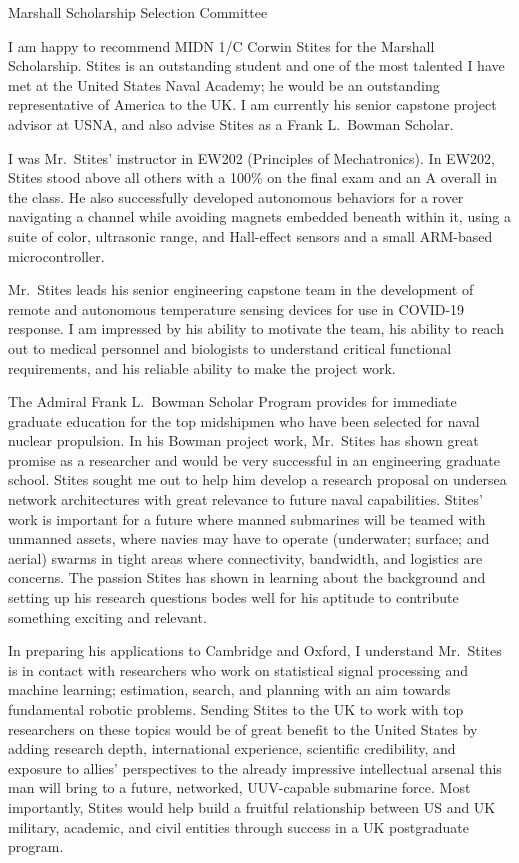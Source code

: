 \documentclass[10pt]{wrceletter}
\date{\today}
\begin{document}
\begin{letter}{%
Marshall Scholarship Selection Committee}

\opening{}
\raggedright %
\setlength{\parindent}{15pt} %
I am happy to recommend MIDN 1/C Corwin Stites for the Marshall Scholarship.  Stites is an outstanding student and one of the most talented I have met at the United States Naval Academy; he would be an outstanding representative of America to the UK. I am currently his senior capstone project advisor at USNA, and also advise Stites as a Frank L.~Bowman Scholar. 

I was Mr.~Stites' instructor in EW202 (Principles of Mechatronics).  In EW202, Stites stood above all others with a 100\% on the final exam and an A overall in the class. He also successfully developed autonomous behaviors for a rover navigating a channel while avoiding magnets embedded beneath within it, using a suite of color, ultrasonic range, and Hall-effect sensors and a small ARM-based microcontroller. 

Mr.~Stites leads his senior engineering capstone team in the development of remote and autonomous temperature sensing devices for use in COVID-19 response. I am impressed by his ability to motivate the team, his ability to reach out to medical personnel and biologists to understand critical functional requirements, and his reliable ability to make the project work. 

The Admiral Frank L.~Bowman Scholar Program provides for immediate graduate education for the top midshipmen who have been selected for naval nuclear propulsion. In his Bowman project work, Mr.~Stites has shown great promise as a researcher and would be very successful in an engineering graduate school. Stites sought me out to help him develop a research proposal on undersea network architectures with great relevance to future naval capabilities. Stites' work is important for a future where manned submarines will be teamed with unmanned assets, where navies may have to operate (underwater; surface; and aerial) swarms in tight areas where connectivity, bandwidth, and logistics are concerns. The passion Stites has shown in learning about the background and setting up his research questions bodes well for his aptitude to contribute something exciting and relevant. 

In preparing his applications to Cambridge and Oxford, I understand Mr.~Stites is in contact with researchers who work on statistical signal processing and machine learning; estimation, search, and planning with an aim towards fundamental robotic problems. Sending Stites to the UK to work with top researchers on these topics would be of great benefit to the United States by adding research depth, international experience, scientific credibility, and exposure to allies' perspectives to the already impressive intellectual arsenal this man will bring to a future, networked, UUV-capable submarine force. Most importantly, Stites would help build a fruitful relationship between US and UK military, academic, and civil entities through success in a UK postgraduate program.

\closing{~} %

\end{letter}
\end{document}
